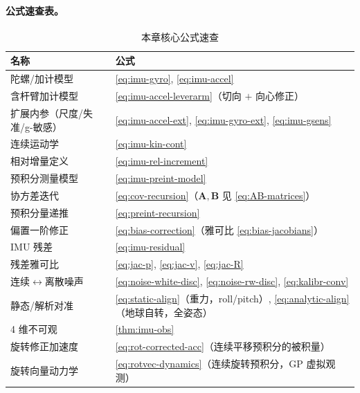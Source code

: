 \paragraph{公式速查表。}
\begin{table}[H]\centering\small
\caption{本章核心公式速查}
\begin{tabular}{ll}
\toprule
名称 & 公式 \\
\midrule
陀螺/加计模型 & \cref{eq:imu-gyro}, \cref{eq:imu-accel} \\
含杆臂加计模型 & \cref{eq:imu-accel-leverarm}（切向 $+$ 向心修正） \\
扩展内参（尺度/失准/g-敏感）& \cref{eq:imu-accel-ext}, \cref{eq:imu-gyro-ext}, \cref{eq:imu-gsens} \\
连续运动学 & \cref{eq:imu-kin-cont} \\
相对增量定义 & \cref{eq:imu-rel-increment} \\
预积分测量模型 & \cref{eq:imu-preint-model} \\
协方差迭代 & \cref{eq:cov-recursion}（$\mathbf A,\mathbf B$ 见 \cref{eq:AB-matrices}） \\
预积分量递推 & \cref{eq:preint-recursion} \\
偏置一阶修正 & \cref{eq:bias-correction}（雅可比 \cref{eq:bias-jacobians}） \\
IMU 残差 & \cref{eq:imu-residual} \\
残差雅可比 & \cref{eq:jac-p}, \cref{eq:jac-v}, \cref{eq:jac-R} \\
连续$\leftrightarrow$离散噪声 & \cref{eq:noise-white-disc}, \cref{eq:noise-rw-disc}, \cref{eq:kalibr-conv} \\
静态/解析对准 & \cref{eq:static-align}（重力，roll/pitch）, \cref{eq:analytic-align}（地球自转，全姿态）\\
4 维不可观 & \cref{thm:imu-obs} \\
旋转修正加速度 & \cref{eq:rot-corrected-acc}（连续平移预积分的被积量）\\
旋转向量动力学 & \cref{eq:rotvec-dynamics}（连续旋转预积分，GP 虚拟观测）\\
\bottomrule
\end{tabular}
\end{table}

